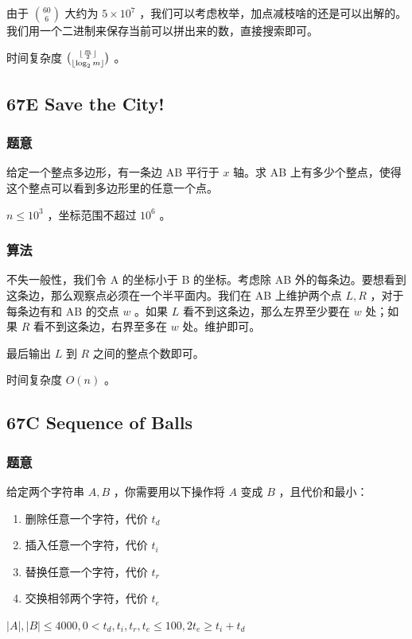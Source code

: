\documentclass[11pt]{article}
\begin{document}
    由于 ${60 \choose 6}$ 大约为 $5 \times 10^7$ ，我们可以考虑枚举，加点减枝啥的还是可以出解的。我们用一个二进制来保存当前可以拼出来的数，直接搜索即可。

    时间复杂度 ${{\lfloor \frac{m}{2} \rfloor} \choose {\lfloor \log_2 m \rfloor}}$ 。
\subsection{67E   Save the City!}
\label{sec-4-8}
\subsubsection{题意}
\label{sec-4-8-1}

    给定一个整点多边形，有一条边 AB 平行于 $x$ 轴。求 AB 上有多少个整点，使得这个整点可以看到多边形里的任意一个点。

    $n \leq 10^3$ ，坐标范围不超过 $10^6$ 。
\subsubsection{算法}
\label{sec-4-8-2}

    不失一般性，我们令 A 的坐标小于 B 的坐标。考虑除 AB 外的每条边。要想看到这条边，那么观察点必须在一个半平面内。我们在 AB 上维护两个点  $L, R$ ，对于每条边有和 AB 的交点 $w$ 。如果 $L$ 看不到这条边，那么左界至少要在 $w$ 处；如果 $R$ 看不到这条边，右界至多在 $w$ 处。维护即可。

    最后输出 $L$ 到 $R$ 之间的整点个数即可。

    时间复杂度 $O(n)$ 。
\subsection{67C   Sequence of Balls}
\label{sec-4-9}
\subsubsection{题意}
\label{sec-4-9-1}

    给定两个字符串 $A, B$ ，你需要用以下操作将 $A$ 变成 $B$ ，且代价和最小：
\begin{enumerate}
\item 删除任意一个字符，代价 $t_d$
\item 插入任意一个字符，代价 $t_i$
\item 替换任意一个字符，代价 $t_r$
\item 交换相邻两个字符，代价 $t_e$
\end{enumerate}

    $|A|, |B| \leq 4000, 0 < t_d, t_i, t_r, t_e \leq 100, 2 t_e \geq t_i + t_d$
\end{document}
